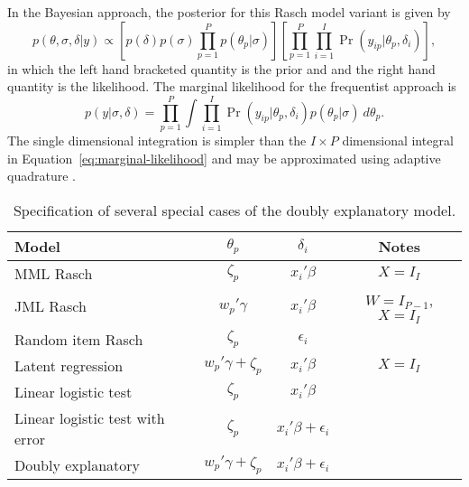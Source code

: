 \documentclass[12pt, letterpaper]{article}
\begin{document}
In the Bayesian approach, the posterior for this Rasch model variant is given by
\begin{equation}
	p(\theta, \sigma, \delta | y) \propto
	\left [
		p(\delta) 	p(\sigma)
		\prod_{p=1}^P p(\theta_p | \sigma)
	\right ]
	\left [
		\prod_{p=1}^P \prod_{i=1}^I
		\Pr ( y_{ip} | \theta_p, \delta_i)
	\right ]
,\end{equation}
in which the left hand bracketed quantity is the prior and and the right hand quantity is the likelihood. The marginal likelihood for the frequentist approach is
\begin{equation}
	p(y | \sigma, \delta) =
	\prod_{p=1}^P
	\int
		\prod_{i=1}^I
		\Pr(y_{ip} | \theta_p, \delta_i)
		p(\theta_p | \sigma)
	~d \theta_p
.\end{equation}
The single dimensional integration is simpler than the $I \times P$ dimensional integral in Equation~\ref{eq:marginal-likelihood} and may be approximated using adaptive quadrature \parencite{rabe2002reliable}.

\begin{table}
	\centering
	\begin{tabular}{lccc}
		\hline
		Model	& $\theta_p$ & $\delta_i$ & Notes \\ \hline
		MML Rasch
			& $\zeta_p$ & $x_i'\beta$ & $X = I_I$ \\
		JML Rasch
			& $w_p' \gamma$ & $x_i'\beta$ & $W = I_{P-1}$, $X = I_I$ \\
		Random item Rasch
			& $\zeta_p$ & $\epsilon_i$ &  \\
		Latent regression
			& $w_p' \gamma + \zeta_p$ & $x_i'\beta$ & $X = I_I$ \\
		Linear logistic test
			& $\zeta_p$ & $x_i'\beta$ &  \\
		Linear logistic test with error
			& $\zeta_p$ & $x_i'\beta + \epsilon_i$ &  \\
		Doubly explanatory
			& $w_p' \gamma + \zeta_p$ &  $x_i'\beta + \epsilon_i$ & \\
		\hline
	\end{tabular}
	\caption[Specification of several special cases of the doubly explanatory model]
	{Specification of several special cases of the doubly explanatory model.}
	\label{tab:special-cases}
\end{table}
\end{document}
